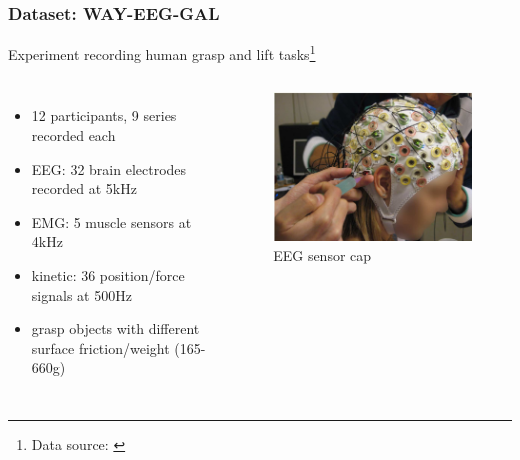 \documentclass{beamer}
\begin{document}
\begin{frame}
\frametitle{Dataset: WAY-EEG-GAL}
Experiment recording human grasp and lift tasks\footnote{Data source: \cite{eeg-emg-dataset}}

\begin{columns}
	\begin{itemize}
        \item 12 participants, 9 series recorded each
        \item EEG: 32 brain electrodes recorded at 5kHz
        \item EMG: 5 muscle sensors at 4kHz
        \item kinetic: 36 position/force signals at 500Hz
        \item grasp objects with different surface friction/weight (165-660g)
    \end{itemize}
    \begin{figure}[ht]
	    \centering
		\includegraphics[width=1\textwidth, trim={3.5cm 1cm 1cm 1cm},clip]{images/eegelectrodes.png}
		\caption{EEG sensor cap}%
    \end{figure}
\end{columns}
\end{frame}
\end{document}
